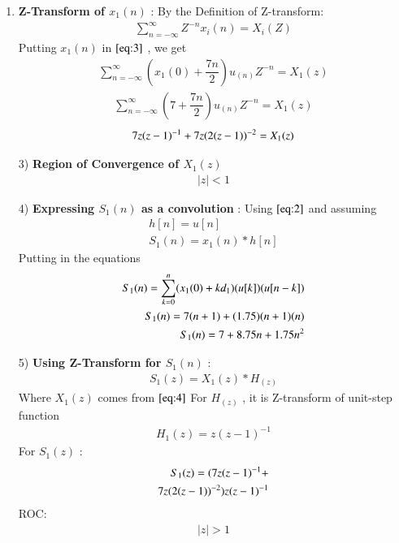\documentclass[journal,12pt,twocolumn]{IEEEtran}
\theoremstyle{remark}
\begin{document}
\begin{enumerate}
\begin{figure}[!ht]
\captionsetup{Graph:1 $x_1(n)$ vs n }
\end{figure}
\vspace{0.05cm}
\item 
\textbf{Z-Transform of $x_1(n)$} :
\vspace{0.2cm}
By the Definition of Z-transform:
\begin{align}
 \sum_{n=-\infty}^{\infty} Z^{-n}x_i(n) = X_i(Z)\label{eq:3}
 \end{align}
\vspace{0.05cm}Putting $x_1(n)$ in $\eqref{eq:3}$ , we get \vspace{0.05cm}
\begin{align}
     \sum_{n=-\infty}^{\infty}(x_1(0) + \dfrac{7n}{2})u_{(n)}Z^{-n} =X_1(z)
\end{align}
\begin{align}
\sum_{n=-\infty}^{\infty}(7 + \dfrac{7n}{2})u_{(n)}Z^{-n} =X_1(z)
\end{align}
\begin{align}
\notag7z(z-1)^{-1}+
7z(2(z-1))^{-2}=X_1(z) \label{eq:4}
\end{align}
\vspace{0.05cm}
\vspace{0.05cm}
\item[3)]
\textbf{Region of Convergence of $X_1(z)$}
\vspace{0.05cm}
\begin{align}
    \lvert z\rvert  <  1 
    \end{align}
    
\vspace{0.7cm}
\item[4)]
\textbf{Expressing $S_1(n)$ as a convolution} :
Using $\eqref{eq:2}$ and assuming 
\begin{align}
         h[n]=u[n] \\
    S_1(n) = x_1(n) * h[n] 
\end{align}
Putting in the equations
\begin{align}
     S_1(n) = \sum_{k=0}^{n}(x_1(0) + kd_1)
 \notag    (u[k])(u[n-k])   \\
 S_1(n) = 7(n+1) + (1.75)(n+1)(n)  \\
  S_1(n) = 7 + 8.75n + 1.75n^2
\end{align}
\item[5)]
\textbf{Using Z-Transform for $S_1(n)$} :
\begin{align}
    S_1(z) = X_1(z) * H_(z)
    \end{align}
    Where $X_1(z)$ comes from $\eqref{eq:4}$
    \vspace{0.05cm}
    For $H_(z)$ , it is Z-transform of unit-step function
    \begin{align}
        H_1(z) = z(z-1)^{-1} \label{eq:9}
    \end{align}
    For $S_1(z)$ :
    \begin{align}
            S_1(z) = \notag(7z(z-1)^{-1}+\\
7z(2(z-1))^{-2})z(z-1)^{-1}
    \end{align}
    ROC:
    \begin{align} 
    \lvert z \rvert > 1
    \end{align}
    

\end{enumerate}
\end{document}
